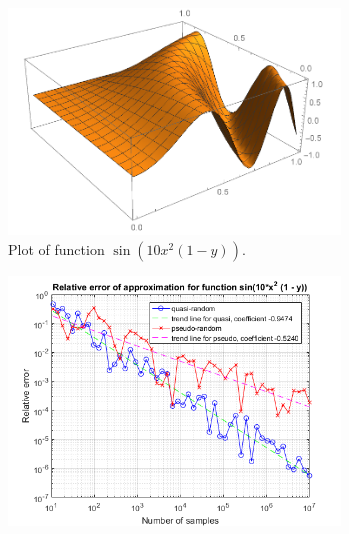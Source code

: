 \documentclass[11pt]{beamer}
\begin{document}
\begin{frame}
    \begin{figure}
        \centering
        \includegraphics[width=250pt]{monte-carlo-sin.pdf}
        \caption{Plot of function $\sin(10 x^2 (1-y))$.}
    \end{figure}
\end{frame}

\begin{frame}
    \begin{figure}
        \centering
        \includegraphics[width=250pt]{monte-carlo-sin-error.png}
    \end{figure}
\end{frame}
\end{document}
